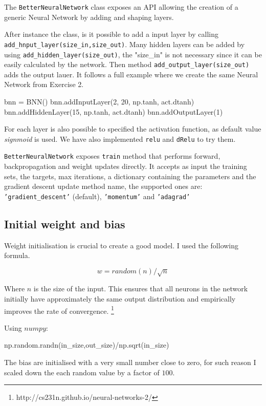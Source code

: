 \documentclass[11pt]{article}
\begin{document}
The \texttt{BetterNeuralNetwork} class exposes an API allowing the creation of a generic Neural Network by adding and shaping layers.

After instance the class, is it possible to add a input layer by calling \texttt{add\_hnput\_layer(size\_in,size\_out)}. Many hidden layers can be added by using \texttt{add\_hidden\_layer(size\_out)}, the "size\_in" is not necessary since it can be easily calculated by the network. Then method \texttt{add\_output\_layer(size\_out)} adds the output lauer. It follows a full example where we create the same Neural Network from Exercise 2.
\begin{python}
   bnn = BNN()
   bnn.addInputLayer(2, 20, np.tanh, act.dtanh)
   bnn.addHiddenLayer(15, np.tanh, act.dtanh)
   bnn.addOutputLayer(1)
\end{python}

For each layer is also possible to specified the activation function, as default value \emph{signmoid} is used. We have also implemented \texttt{relu} and \texttt{dRelu} to try them.

\texttt{BetterNeuralNetwork} exposes \texttt{train} method that performs forward, backpropagation and weight updates directly. It accepts as input the training sets, the targets, max iterations, a dictionary containing the parameters and the gradient descent update method name, the supported ones are: \texttt{'gradient\_descent'} (default), \texttt{'momentum'} and \texttt{'adagrad'}\subsection{Initial weight and bias}
Weight initialisation is crucial to create a good model. I used the following formula.

$$w = random(n)/\sqrt{n}$$

Where $n$ is the size of the input. This ensures that all neurons in the network initially have approximately the same output distribution and empirically improves the rate of convergence. \footnote{http://cs231n.github.io/neural-networks-2/}

Using $numpy$:
\begin{python}
np.random.randn(in_size,out_size)/np.sqrt(in_size)
\end{python}

The bias are initialised with a very small number close to zero, for such reason I scaled down the each random value by a factor of $100$.
\end{document}
